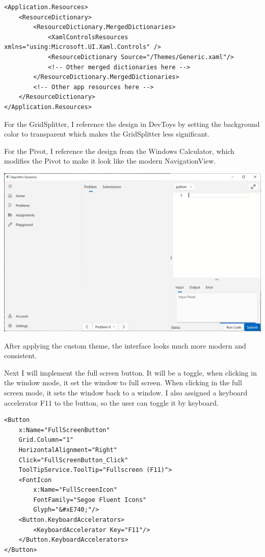\documentclass[a4paper]{report}
\begin{document}
\begin{verbatim}
<Application.Resources>
    <ResourceDictionary>
        <ResourceDictionary.MergedDictionaries>
            <XamlControlsResources xmlns="using:Microsoft.UI.Xaml.Controls" />
            <ResourceDictionary Source="/Themes/Generic.xaml"/>
            <!-- Other merged dictionaries here -->
        </ResourceDictionary.MergedDictionaries>
        <!-- Other app resources here -->
    </ResourceDictionary>
</Application.Resources>
\end{verbatim}

For the GridSplitter, I reference the design in DevToys\cite{github:DevToys:Generic.xaml} by setting the background color to transparent which makes the GridSplitter less significant.

For the Pivot, I reference the design from the Windows Calculator\cite{github:calculator:Calculator.xaml}, which modifies the Pivot to make it look like the modern NavigationView.

\includegraphics[width=\textwidth, height=\textheight, keepaspectratio]{CodingPage-Theme}

After applying the custom theme, the interface looks much more modern and consistent.

Next I will implement the full screen button. It will be a toggle, when clicking in the window mode, it set the window to full screen. When clicking in the full screen mode, it sets the window back to a window. I also assigned a keyboard accelerator F11 to the button, so the user can toggle it by keyboard.

\begin{verbatim}
<Button
    x:Name="FullScreenButton"
    Grid.Column="1"
    HorizontalAlignment="Right"
    Click="FullScreenButton_Click"
    ToolTipService.ToolTip="Fullscreen (F11)">
    <FontIcon
        x:Name="FullScreenIcon"
        FontFamily="Segoe Fluent Icons"
        Glyph="&#xE740;"/>
    <Button.KeyboardAccelerators>
        <KeyboardAccelerator Key="F11"/>
    </Button.KeyboardAccelerators>
</Button>
\end{verbatim}
\end{document}
